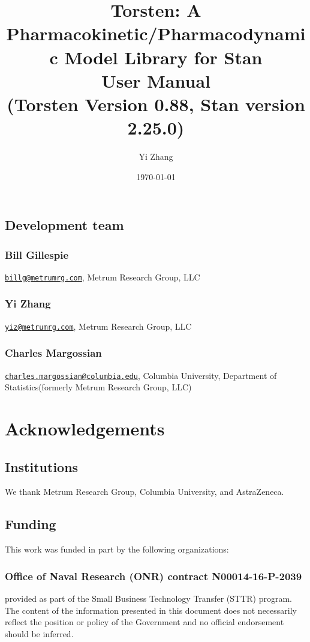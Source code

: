 \documentclass[10pt, reqno, oneside]{amsbook}
\author{Yi Zhang}
\date{\today}
\title{Torsten: A Pharmacokinetic/Pharmacodynamic Model Library for Stan\\\medskip
\large User Manual \\  (Torsten Version 0.88, Stan version 2.25.0)}
\numberwithin{equation}{chapter}
\numberwithin{figure}{chapter}
\numberwithin{table}{chapter}
\theoremstyle{remark}
\begin{document}
\maketitle
\tableofcontents


\section*{Development team}
\label{sec:org90cac42}
\subsection*{Bill Gillespie}
\label{sec:org06bcb9c}
\href{mailto:billg@metrumrg.com}{\texttt{billg@metrumrg.com}},
Metrum Research Group, LLC
\subsection*{Yi Zhang}
\label{sec:org2964d4d}
\href{mailto:yiz@metrumrg.com}{\texttt{yiz@metrumrg.com}}, Metrum Research Group, LLC
\subsection*{Charles Margossian}
\label{sec:orgb48f33f}
\href{mailto:charles.margossian@columbia.edu}{\texttt{charles.margossian@columbia.edu}}, Columbia University, Department of Statistics(formerly Metrum Research Group, LLC)

\chapter*{Acknowledgements}
\label{sec:orgb5fcb9f}
\section*{Institutions}
\label{sec:org7e44977}
We thank Metrum Research Group, Columbia University, and AstraZeneca.
\section*{Funding}
\label{sec:orgdb8a9ec}
This work was funded in part by the following organizations:
\subsection*{Office of Naval Research (ONR) contract N00014-16-P-2039}
\label{sec:org4d3136c}
provided as part of the Small Business Technology Transfer (STTR)
program. The content of the information presented in this document
does not necessarily reflect the position or policy of the
Government and no official endorsement should be inferred.
\end{document}
